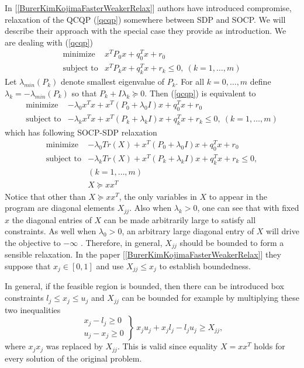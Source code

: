 \documentclass[12pt]{book}
\theoremstyle{definition}
\begin{document}
In [\ref{BurerKimKojimaFasterWeakerRelax}] authors have introduced compromise, relaxation of the QCQP (\ref{qcqp}) somewhere between SDP and SOCP. We will describe their approach with the special case they provide as introduction.
We are dealing with (\ref{qcqp})
\begin{equation}
\begin{array}{ll}
\mbox{minimize}& x^TP_0x + q_0^Tx + r_0 \\
\mbox{subject to}& x^TP_kx + q_k^Tx + r_k \leq 0, \  (k = 1,\dots ,m)
\end{array} 
\end{equation}
Let  $\lambda_{min}(P_k)$ denote smallest eigenvalue of $P_k$.
For all $k=0,\dots ,m$ define $\lambda_k=-\lambda_{min}(P_k)$ so that $P_k + I\lambda_k\succeq 0$. Then (\ref{qcqp}) is equivalent to 
\begin{equation}
\begin{array}{ll}
\mbox{minimize}& -\lambda_0 x^Tx +  x^T(P_0+\lambda_0 I)x + q_0^Tx + r_0\\
\mbox{subject to}& -\lambda_kx^Tx +  x^T(P_k+\lambda_kI)x + q_k^Tx + r_k \leq 0, \  (k = 1,\dots ,m)
\end{array} 
\end{equation}
which has following SOCP-SDP relaxation
\begin{equation}
\label{InBetweenSOCPSDP1}
\begin{array}{ll}
\mbox{minimize}& -\lambda_0 Tr(X) +  x^T(P_0+\lambda_0 I)x + q_0^Tx +r_0 \\
\mbox{subject to}& -\lambda_k Tr(X) +  x^T(P_k+\lambda_kI)x + q_k^Tx + r_k \leq 0, \\  
&(k = 1,\dots ,m) \\
& X\succeq xx^T
\end{array} 
\end{equation}
Notice that other than $X\succeq xx^T$, the only variables in $X$ to appear in the program are diagonal elements $X_{jj}$.
Also when $\lambda_k>0$, one can see that with fixed $x$ the diagonal entries of $X$ can be made arbitrarily large to satisfy all constraints. As well when $\lambda_0>0$, an arbitrary large diagonal entry of $X$ will drive the objective to $-\infty$ . Therefore, in general, $X_{jj}$ should be bounded to form a sensible relaxation. In the paper [\ref{BurerKimKojimaFasterWeakerRelax}] they suppose that $x_j\in [0,1]$ and use $X_{jj}\leq x_j$ to establish boundedness. 

\rem In general, if the feasible region is bounded, then there can be introduced box constraints $l_j\leq x_j \leq u_j$ and $X_{jj}$ can be bounded for example by multiplying these two inequalities 
\begin{equation}
\left.\begin{array}{r}
x_j - l_j \geq 0\\
u_j - x_j \geq 0
\end{array}\right\rbrace \
x_ju_j + x_jl_j - l_ju_j \geq X_{jj},
\end{equation} 
where $x_jx_j$ was replaced by $X_{jj}$. This is valid since equality $X = xx^T$ holds for every solution of the original problem. 
\medskip
\end{document}
